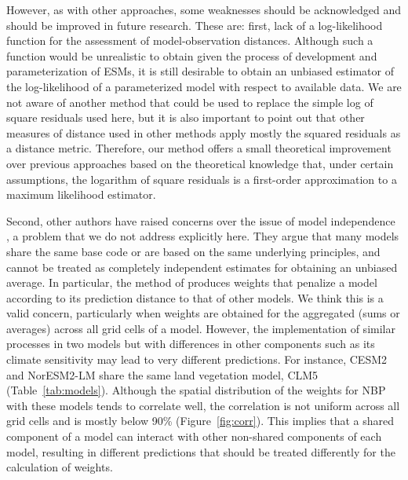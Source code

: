 \documentclass[gmd, manuscript]{copernicus}
\begin{document}
However, as with other approaches, some weaknesses should be acknowledged and should be improved in future research. These are: first, lack of a log-likelihood function for the assessment of model-observation distances. Although such a function would be unrealistic to obtain given the process of development and parameterization of ESMs, it is still desirable to obtain an unbiased estimator of the log-likelihood of a parameterized model with respect to available data. We are not aware of another method that could be used to replace the simple log of square residuals used here, but it is also important to point out that other measures of distance used in other methods apply mostly the squared residuals as a distance metric. Therefore, our method offers a small theoretical improvement over previous approaches based on the theoretical knowledge that, under certain assumptions, the logarithm of square residuals is a first-order approximation to a maximum likelihood estimator. 

Second, other authors have raised concerns over the issue of model independence \citep{Knutti2010CC, Knutti2010JC}, a problem that we do not address explicitly here. They argue that many models share the same base code or are based on the same underlying principles, and cannot be treated as completely independent estimates for obtaining an unbiased average. In particular, the method of \citet{Knutti2017} produces weights that penalize a model according to its prediction distance to that of other models. We think this is a valid concern, particularly when weights are obtained for the aggregated (sums or averages) across all grid cells of a model. However, the implementation of similar processes in two models but with differences in other components such as its climate sensitivity may lead to very different predictions. For instance, CESM2 and NorESM2-LM share the same land vegetation model, CLM5 (Table~\ref{tab:models}). Although the spatial distribution of the weights for NBP with these models tends to correlate well, the correlation is not uniform across all grid cells and is mostly below 90\% (Figure~\ref{fig:corr}). This implies that a shared component of a model can interact with other non-shared components of each model, resulting in different predictions that should be treated differently for the calculation of weights. 
\end{document}
